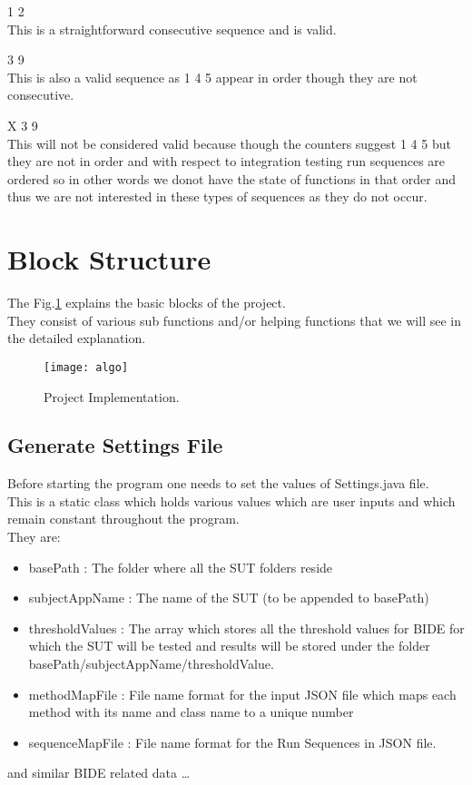 \checkmark{} 1 2\\
\tab This is a straightforward consecutive sequence and is valid.

\checkmark {} 3 9\\
\tab This is also a valid sequence as 1 4 5 appear in order though they are not consecutive.

{\large{X}} 3 9\\
\tab This will not be considered valid because though the counters suggest 1 4 5 but they are not in order and with respect to integration testing run sequences are ordered so in other words we donot have the state of functions in that order and thus we are not interested in these types of sequences as they do not occur.

\section{Block Structure}
The Fig.\ref{algo} explains the basic blocks of the project.\\
They consist of various sub functions and/or helping functions that we will see in the detailed explanation.

\begin{figure}[h]
\centering
 \texttt{[image: algo]}
\caption{Project Implementation.}
\label{algo}
\end{figure}

\subsection{Generate Settings File}
Before starting the program one needs to set the values of Settings.java file.\\
This is a static class which holds various values which are user inputs and which remain constant throughout the program.\\
They are:
\begin{itemize}
\item basePath : The folder where all the SUT folders reside
\item subjectAppName : The name of the SUT (to be appended to basePath)
\item thresholdValues : The array which stores all the threshold values for BIDE for which the SUT will be tested and results will be stored under the folder basePath/subjectAppName/thresholdValue.
\item methodMapFile : File name format for the input JSON file which maps each method with its name and class name to a unique number
\item sequenceMapFile : File name format for the Run Sequences in JSON file.
\end{itemize}
\tab and similar BIDE related data \dots

